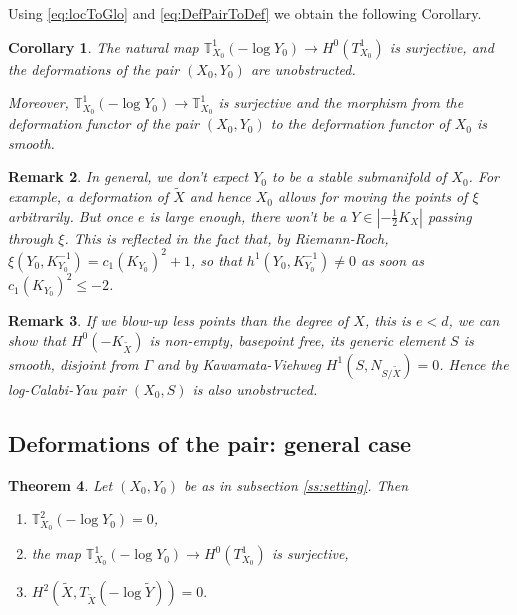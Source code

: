 \documentclass[10pt,a4paper]{amsart}
\newtheorem{thm}{Theorem}[section]
\newtheorem{cor}[thm]{Corollary}
\newtheorem{rem}[thm]{Remark}
\newcommand{\abs}[1]{\left\vert#1\right\vert}
\begin{document}
Using \ref{eq:locToGlo} and \ref{eq:DefPairToDef} we obtain the following Corollary.

\begin{cor}
  The natural map $\mathbb{T}_{X_0}^1(-\log Y_0)\to H^0(T_{X_0}^1)$ is surjective, and the deformations of the pair $(X_0,Y_0)$ are unobstructed.
  
  Moreover, $\mathbb{T}_{X_0}^1(-\log Y_0)\to \mathbb{T}_{X_0}^1$ is surjective and the morphism from the deformation functor of the pair $(X_0,Y_0)$ to the deformation functor of $X_0$ is smooth.
\end{cor}

\begin{rem}
  In general, we don't expect $Y_0$ to be a stable submanifold of $X_0$. For example, a deformation of $\tilde X$ and hence $X_0$ allows for moving the points of $\xi$ arbitrarily. 
  But once $e$ is large enough, there won't be a $Y\in \abs{-\frac{1}{2} K_X}$ passing through $\xi$. This is reflected in the fact that, by Riemann-Roch, $\xi(Y_0, K_{Y_0}^{-1})=c_1(K_{Y_0})^2+1$, so that $h^1(Y_0, K_{Y_0}^{-1})\not = 0$ as soon as $c_1(K_{Y_0})^2\leq -2$.
\end{rem}

\begin{rem}
If we blow-up less points than the degree of $X$, this is $e<d$, we can show that $H^0(-K_{\tilde {X}})$ is non-empty, basepoint free, its generic element $S$ is smooth, disjoint from $\Gamma$ and by Kawamata-Viehweg $H^1(S,N_{S/\tilde X})=0$. Hence the log-Calabi-Yau pair $(X_0,S)$ is also unobstructed.
\end{rem}


\subsection{Deformations of the pair: general case}

\begin{thm}\label{thm:unobstructedness}
  Let $(X_0,Y_0)$ be as in subsection \ref{ss:setting}. Then
  \begin{enumerate}
    \item $\mathbb{T}_{X_0}^2(-\log Y_0)=0$,
    \item the map $\mathbb{T}_{X_0}^1(-\log Y_0)\to H^0(T_{X_0}^1)$ is surjective,
    \item $H^2(\tilde{X}, T_{\tilde X}(-\log \tilde Y))=0.$
  \end{enumerate}
   
\end{thm}
\end{document}
